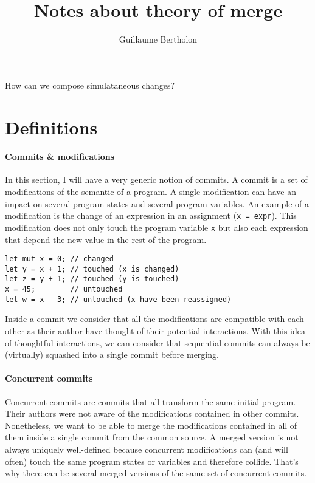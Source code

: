 \documentclass[a4paper,10pt]{article}
\title{Notes about theory of merge}
\author{Guillaume Bertholon}
\begin{document}
\maketitle

How can we compose simulataneous changes?

\section{Definitions}

\paragraph{Commits \& modifications}
In this section, I will have a very generic notion of commits. A commit is a set of modifications of the semantic of a program. A single modification
can have an impact on several program states and several program variables.
An example of a modification is the change of an expression in an assignment (\lstinline{x = expr}). This modification does not only touch the program variable \lstinline{x} but also each expression that depend the new value in the rest of the program.
\begin{lstlisting}[caption=Modification of $x$]
let mut x = 0; // changed
let y = x + 1; // touched (x is changed)
let z = y + 1; // touched (y is touched)
x = 45;        // untouched
let w = x - 3; // untouched (x have been reassigned)
\end{lstlisting}
Inside a commit we consider that all the modifications are compatible with each
other as their author have thought of their potential interactions.
With this idea of thoughtful interactions, we can consider that sequential commits can always be (virtually) squashed into a single commit before merging.

\paragraph{Concurrent commits}
Concurrent commits are commits that all transform the same initial program. Their authors were not aware of the modifications contained in other commits. Nonetheless, we want to be able to merge the modifications contained in all of them inside a single commit from the common source. A merged version is not always uniquely well-defined because concurrent modifications can (and will often) touch the same program states or variables and therefore collide. That's why there can be several merged versions of the same set of concurrent commits.
\end{document}
